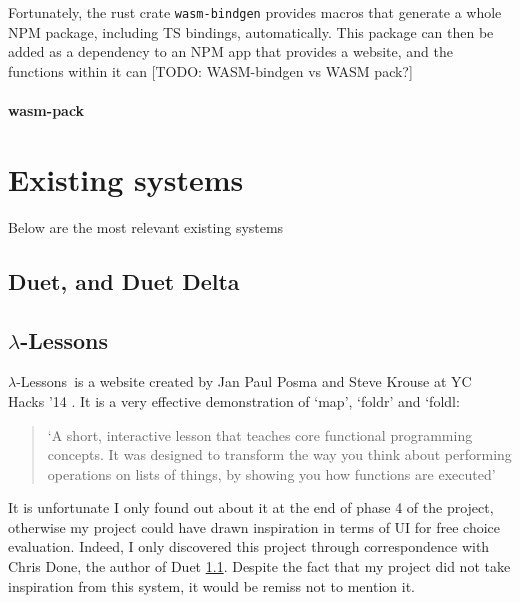 Fortunately, the rust crate \verb|wasm-bindgen| provides macros that generate a whole NPM package, including TS bindings, automatically. This package can then be added as a dependency to an NPM app that provides a website, and the functions within it can [TODO: WASM-bindgen vs WASM pack?]

\paragraph{wasm-pack}
\label{bg:wasm-pack}

\section{Existing systems}
Below are the most relevant existing systems 

\subsection{Duet, and Duet Delta}
\label{bg:duet}

\subsection{$\lambda$-Lessons}
\newcommand{\llessons}{$\lambda$-Lessons}

\llessons\ is a website created by Jan Paul Posma and Steve Krouse at YC Hacks '14 \cite{lambdalessons}. It is a very effective demonstration of `map', `foldr' and `foldl:

\begin{quotation}
`A short, interactive lesson that teaches core functional programming concepts. It was designed to transform the way you think about performing operations on lists of things, by showing you how functions are executed' \cite{lambdalessons}
\end{quotation}

\noindent It is unfortunate I only found out about it at the end of phase 4 of the project, otherwise my project could have drawn inspiration in terms of UI for free choice evaluation. Indeed, I only discovered this project through correspondence with Chris Done, the author of Duet \ref{bg:duet}. Despite the fact that my project did not take inspiration from this system, it would be remiss not to mention it. 

